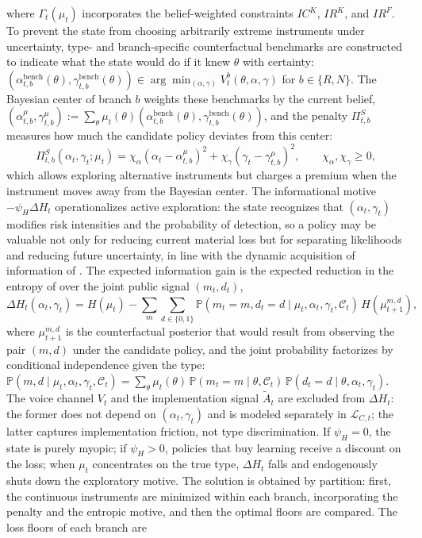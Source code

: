 \documentclass[review,authoryear,12pt]{elsarticle}
\theoremstyle{plain}
\theoremstyle{definition}
\newcommand{\Prob}{\mathbb{P}}
\newcommand{\1}{\mathbf{1}}
\begin{document}
where $\Gamma_t(\mu_t)$ incorporates the belief-weighted constraints $IC^K$, $IR^K$, and $IR^F$. To prevent the state from choosing arbitrarily extreme instruments under uncertainty, type- and branch-specific counterfactual benchmarks are constructed to indicate what the state would do if it knew $\theta$ with certainty: $(\alpha_{t,b}^{\mathrm{bench}}(\theta),\gamma_{t,b}^{\mathrm{bench}}(\theta))\in\arg\min_{(\alpha,\gamma)}V_t^b(\theta,\alpha,\gamma)$ for $b\in\{R,N\}$. The Bayesian center of branch $b$ weights these benchmarks by the current belief, $(\alpha_{t,b}^{\mu},\gamma_{t,b}^{\mu}):=\sum_\theta\mu_t(\theta)(\alpha_{t,b}^{\mathrm{bench}}(\theta),\gamma_{t,b}^{\mathrm{bench}}(\theta))$, and the penalty $\Pi_{t,b}^S$ measures how much the candidate policy deviates from this center:
\begin{equation}
\Pi_{t,b}^S(\alpha_t,\gamma_t;\mu_t)=\chi_\alpha(\alpha_t-\alpha_{t,b}^{\mu})^2+\chi_\gamma(\gamma_t-\gamma_{t,b}^{\mu})^2,\qquad\chi_\alpha,\chi_\gamma\ge 0,
\label{eq:prima-desviacion}
\end{equation}
which allows exploring alternative instruments but charges a premium when the instrument moves away from the Bayesian center. The informational motive $-\psi_H\Delta H_t$ operationalizes active exploration: the state recognizes that $(\alpha_t,\gamma_t)$ modifies risk intensities and the probability of detection, so a policy may be valuable not only for reducing current material loss but for separating likelihoods and reducing future uncertainty, in line with the dynamic acquisition of information of \citet{Zhong2022}. The expected information gain is the expected reduction in the entropy of \citet{Shannon1948} over the joint public signal $(m_t,d_t)$,
\begin{equation}
\Delta H_t(\alpha_t,\gamma_t)=H(\mu_t)-\sum_{m}\sum_{d\in\{0,1\}}\Prob(m_t=m,d_t=d\mid\mu_t,\alpha_t,\gamma_t,\mathcal{C}_t)\,H(\mu_{t+1}^{m,d}),
\label{eq:delta-H}
\end{equation}
where $\mu_{t+1}^{m,d}$ is the counterfactual posterior that would result from observing the pair $(m,d)$ under the candidate policy, and the joint probability factorizes by conditional independence given the type: $\Prob(m,d\mid\mu_t,\alpha_t,\gamma_t,\mathcal{C}_t)=\sum_{\theta}\mu_t(\theta)\,\Prob(m_t=m\mid\theta,\mathcal{C}_t)\,\Prob(d_t=d\mid\theta,\alpha_t,\gamma_t)$. The voice channel $V_t$ and the implementation signal $\tilde{A}_t$ are excluded from $\Delta H_t$: the former does not depend on $(\alpha_t,\gamma_t)$ and is modeled separately in $\mathcal{L}_{C,t}$; the latter captures implementation friction, not type discrimination. If $\psi_H=0$, the state is purely myopic; if $\psi_H>0$, policies that buy learning receive a discount on the loss; when $\mu_t$ concentrates on the true type, $\Delta H_t$ falls and endogenously shuts down the exploratory motive. The solution is obtained by partition: first, the continuous instruments are minimized within each branch, incorporating the penalty and the entropic motive, and then the optimal floors are compared. The loss floors of each branch are
\end{document}
